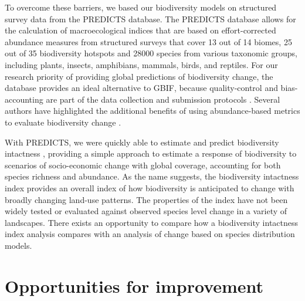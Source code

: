 \documentclass[titlesmallcaps,copyrightpage]{uomthesis}\usepackage[]{graphicx}\usepackage[]{color}
\begin{document}
To overcome these barriers, we based our biodiversity models on structured survey data from the PREDICTS database. The PREDICTS database allows for the calculation of macroecological indices that are based on effort-corrected abundance measures from structured surveys that cover 13 out of 14 biomes, 25 out of 35 biodiversity hotspots and 28000 species from various taxonomic groups, including plants, insects, amphibians, mammals, birds, and reptiles. For our research priority of providing global predictions of biodiversity change, the database provides an ideal alternative to GBIF, because quality-control and bias-accounting are part of the data collection and submission protocols \citep{hudson_predicts_2014}. Several authors have highlighted the additional benefits of using abundance-based metrics to evaluate biodiversity change \citep{scholes_biodiversity_2005, newbold_global_2015}.

With PREDICTS, we were quickly able to estimate and predict biodiversity intactness \citep{scholes_biodiversity_2005}, providing a simple approach to estimate a response of biodiversity to scenarios of socio-economic change with global coverage, accounting for both species richness and abundance. As the name suggests, the biodiversity intactness index provides an overall index of how biodiversity is anticipated to change with broadly changing land-use patterns.  The properties of the index have not been widely tested or evaluated against observed species level change in a variety of landscapes. There exists an opportunity to compare how a biodiversity intactness index analysis compares with an analysis of change based on species distribution models.

\section{Opportunities for improvement}
\end{document}
